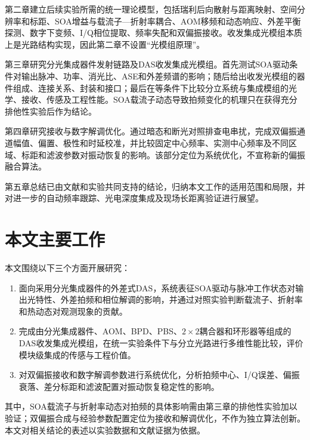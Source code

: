 第二章建立后续实验所需的统一理论模型，包括瑞利后向散射与距离映射、空间分辨率和标距、SOA增益与载流子—折射率耦合、AOM移频和动态响应、外差平衡探测、数字下变频、I/Q相位提取、频率失配和双偏振接收。收发集成光模组本质上是光路结构实现，因此第二章不设置“光模组原理”。

第三章研究分光集成器件发射链路及DAS收发集成光模组。首先测试SOA驱动条件对输出脉冲、功率、消光比、ASE和外差频谱的影响；随后给出收发光模组的器件组成、连接关系、封装和接口；最后在等条件下比较分立系统与集成模组的光学、接收、传感及工程性能。SOA载流子动态导致拍频变化的机理只在获得充分排他性实验后作为结论。

第四章研究接收与数字解调优化。通过暗态和断光对照排查电串扰，完成双偏振通道幅值、偏置、极性和时延校准，并比较固定中心频率、实测中心频率及不同区域、标距和滤波参数对振动恢复的影响。该部分定位为系统优化，不宣称新的偏振融合算法。

第五章总结已由文献和实验共同支持的结论，归纳本文工作的适用范围和局限，并对进一步的自动频率跟踪、光电深度集成及现场长距离验证进行展望。

\section{本文主要工作}

本文围绕以下三个方面开展研究：

\begin{enumerate}
  \item 面向采用分光集成器件的外差式DAS，系统表征SOA驱动与脉冲工作状态对输出光特性、外差拍频和相位解调的影响，并通过对照实验判断载流子、折射率和热动态对观测现象的贡献。
  \item 完成由分光集成器件、AOM、BPD、PBS、$2\times2$耦合器和环形器等组成的DAS收发集成光模组，在统一实验条件下与分立光路进行多维性能比较，评价模块级集成的传感与工程价值。
  \item 对双偏振接收和数字解调参数进行系统优化，分析拍频中心、I/Q误差、偏振衰落、差分标距和滤波配置对振动恢复稳定性的影响。
\end{enumerate}

其中，SOA载流子与折射率动态对拍频的具体影响需由第三章的排他性实验加以验证；双偏振合成与经验参数配置定位为接收和解调优化，不作为独立算法创新。本文对相关结论的表述以实验数据和文献证据为依据。
